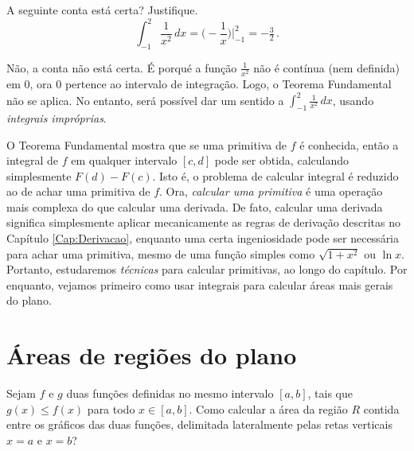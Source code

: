 \begin{exo}\label{exo_TFCnaoseaplica}
A seguinte conta está certa? Justifique.
\[
\int_{-1}^2\frac{1}{x^2}\,dx=\bigl(-\frac{1}{x}\bigr)\Big|_{-1}^2=-\tfrac32\,.
\]
\begin{sol}
Não, a conta não está certa. É porqué a função $\frac{1}{x^2}$ não é
contínua (nem definida) em $0$, ora $0$ pertence ao intervalo de
integração. Logo, o Teorema Fundamental não se aplica.
No entanto, será possível dar um sentido a
$\int_{-1}^2\frac{1}{x^2}\,dx$, usando \emph{integrais impróprias}.
\end{sol}
\end{exo}

O Teorema Fundamental mostra que se uma primitiva de $f$ é
conhecida, então a integral de $f$ em qualquer intervalo $[c,d]$ pode ser
obtida, calculando simplesmente $F(d)-F(c)$. 
Isto é, o problema de calcular integral é reduzido ao de achar uma primitiva de
$f$. 
Ora, \emph{calcular uma primitiva} é uma operação mais complexa do que calcular
uma derivada. De fato, calcular
uma derivada significa simplesmente aplicar mecanicamente as regras de
derivação descritas no Capítulo \ref{Cap:Derivacao}, enquanto uma certa
ingeniosidade pode ser necessária para achar uma primitiva, mesmo de uma
função simples como $\sqrt{1+x^2}$ ou $\ln x$.\\

Portanto, estudaremos \emph{técnicas} para calcular primitivas, ao longo
do capítulo. Por enquanto, vejamos primeiro como usar integrais para calcular
áreas mais gerais do plano.

\section{Áreas de regiões do plano}


Sejam $f$ e $g$ duas funções definidas no mesmo intervalo $[a,b]$, tais que
$g(x)\leq f(x)$ para todo $x\in [a,b]$. Como calcular a área da região $R$
contida entre os gráficos das duas funções, delimitada lateralmente pelas
retas verticais $x=a$ e $x=b$?


